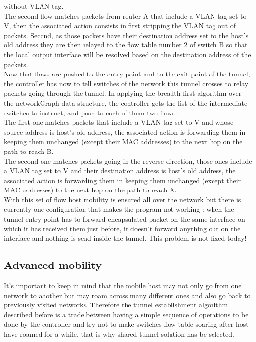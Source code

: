\documentclass{article}
\begin{document}
without VLAN tag.\\
\newline
The second flow matches packets from router A that include a VLAN
tag set to V, then the associated action consists in first
stripping the VLAN tag out of packets. Second, as those packets
have their destination address set to the host's old address they
are then relayed to the flow table number 2 of switch B so that
the local output interface will be resolved based on the
destination address of the packets.\\
\newline
Now that flows are pushed to the entry point and to the exit point of
the tunnel, the controller has now to tell switches of the network
this tunnel crosses to relay packets going through the tunnel. In
applying the breadth-first algorithm over the networkGraph data
structure, the controller gets the list of the intermediate switches to
instruct, and push to each of them two flows : \\
\newline
The first one matches packets that include a VLAN tag set to V and
whose source address is host's old address, the associated action is
forwarding them in keeping them unchanged (except their MAC
addresses) to the next hop on the path to reach B.\\
\newline
The second one matches packets going in the reverse direction, those
ones include a VLAN tag set to V and their destination address is host's
old address, the associated action is forwarding them in keeping them
unchanged (except their MAC addresses) to the next hop on the path to
reach A.\\
\newline
With this set of flow host mobility is ensured all over the network
but there is currently one configuration that makes the program not
working : when the tunnel entry point has to forward encapsulated
packet on the same interface on which it has received them just before,
it doesn't forward anything out on the interface and nothing is send
inside the tunnel. This problem is not fixed today!

\subsection{Advanced mobility}
It's important to keep in mind that the mobile host may not only go
from one network to another but may roam across many different ones
and also go back to previously visited networks. Therefore the tunnel
establishment algorithm described before is a trade between having a
simple sequence of operations to be done by the controller and try not
to make switches flow table soaring after host have roamed for a
while, that is why shared tunnel solution has be selected.
\end{document}
